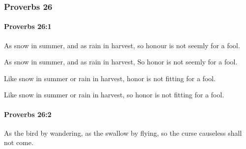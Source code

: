 	\subsubsection{Proverbs 26} %
		\label{PROVERBS-26}

		\paragraph{Proverbs 26:1} %
			\label{PROVERBS-26-1}

			As snow in summer, and as rain in harvest, so honour is not seemly for a fool.

			\begin{versebox}
					\item[BHS] 
					\item[ASV] As snow in summer, and as rain in harvest, So honor is not seemly for a fool.
					\item[NIV] Like snow in summer or rain in harvest, honor is not fitting for a fool.
					\item[NRSV] Like snow in summer or rain in harvest, so honor is not fitting for a fool.
			\end{versebox}

		\paragraph{Proverbs 26:2} %
			\label{PROVERBS-26-2}

			As the bird by wandering, as the swallow by flying, so the curse causeless shall not come.

